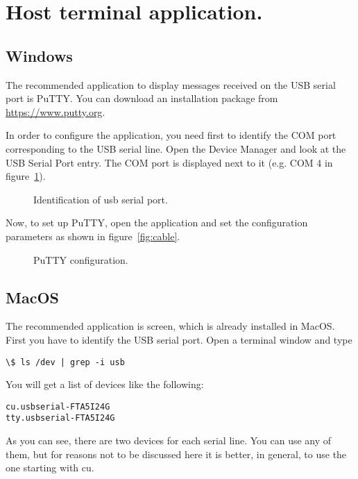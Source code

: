 \section{Host terminal application.}\label{sc:term}
\subsection{Windows}

The recommended application to display messages received on the USB serial port is PuTTY. You can download an installation package from \url{https://www.putty.org}.

In order to configure the application, you need first to identify the COM port corresponding to the USB serial line. Open the Device Manager and look at the USB Serial Port entry. The COM port is displayed next to it (e.g. COM 4 in figure~\ref{fig:com}).

\begin{figure}[h]
            \caption{Identification of usb serial port.}
            \label{fig:com}
\end{figure}

Now, to set up PuTTY, open the application and set the configuration parameters as shown in figure~\ref{fig:cable}.

\begin{figure}[h]
            \caption{PuTTY configuration.}
            \label{fig:putty}
\end{figure}

\subsection{MacOS}
The recommended application is screen, which is already installed in MacOS.
First you have to identify the USB serial port. Open a terminal window and type
\begin{verbatim}
\$ ls /dev | grep -i usb
\end{verbatim}
You will get a list of devices like the following:
\begin{verbatim}
cu.usbserial-FTA5I24G
tty.usbserial-FTA5I24G
\end{verbatim}

As you can see, there are two devices for each serial line. You can use any of them, but for reasons not to be discussed here it is better, in general, to use the one starting with cu.

